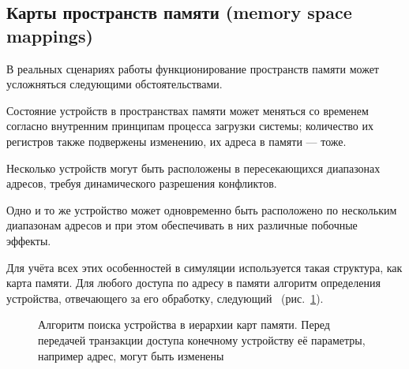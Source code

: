 \subsection[Карты пространств памяти]{Карты пространств памяти (memory space mappings)}\label{sec:mem-maps}

В реальных сценариях работы функционирование пространств памяти может усложняться следующими обстоятельствами.

\begin{itemize*}
\item Состояние устройств в пространствах памяти может меняться со временем согласно внутренним принципам процесса загрузки системы; количество их регистров также подвержены изменению, их адреса в памяти — тоже.
\item Несколько устройств могут быть расположены в пересекающихся диапазонах адресов, требуя динамического разрешения конфликтов.
\item Одно и то же устройство может одновременно быть расположено по нескольким диапазонам адресов и при этом обеспечивать в них различные побочные эффекты.
\end{itemize*}

Для учёта всех этих особенностей в симуляции используется такая структура, как карта памяти. Для любого доступа по адресу в памяти алгоритм определения устройства, отвечающего за его обработку, следующий~\citep{simics-model-builder-guide} (рис.~\ref{fig:mapalg}).

\begin{figure}[htb]
    \centering
    \caption[Алгоритм поиска устройства в иерархии карт памяти]{Алгоритм поиска устройства в иерархии карт памяти. Перед передачей транзакции доступа конечному устройству её параметры, например адрес, могут быть изменены}
    \label{fig:mapalg}
\end{figure}

